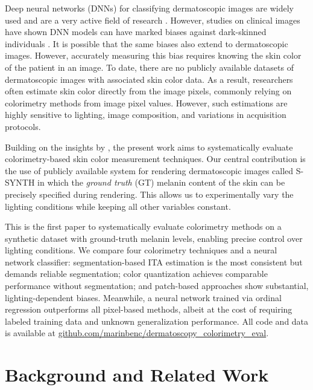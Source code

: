 \documentclass[a4paper,conference]{IEEEtran}
\begin{document}
Deep neural networks (DNNs) for classifying dermatoscopic images  are widely used and are a very active field of research \cite{kurtanskyEffectPatientContextual2024, estevaDermatologistlevelClassificationSkin2017}. However, studies on clinical images have shown DNN models can have marked biases against dark-skinned individuals \cite{daneshjouDisparitiesDermatologyAI2022, bevanDetectingMelanomaFairly2022}. It is possible that the same biases also extend to dermatoscopic images. However, accurately measuring this bias requires knowing the skin color of the patient in an image. To date, there are no publicly available datasets of dermatoscopic images with associated skin color data. As a result, researchers often estimate skin color directly from the image pixels, commonly relying on colorimetry methods from image pixel values. However, such estimations are highly sensitive to lighting, image composition, and variations in acquisition protocols.

Building on the insights by \citet{kalbRevisitingSkinTone2023}, the present work aims to systematically evaluate colorimetry-based skin color measurement techniques. Our central contribution is the use of publicly available system for rendering dermatoscopic images called S-SYNTH \cite{kim2024ssynth} in which the \textit{ground truth} (GT) melanin content of the skin can be precisely specified during rendering. This allows us to experimentally vary the lighting conditions while keeping all other variables constant.

This is the first paper to systematically evaluate colorimetry methods on a synthetic dataset with ground-truth melanin levels, 
enabling precise control over lighting conditions. We compare four colorimetry techniques and a neural network classifier: 
segmentation-based ITA estimation is the most consistent but demands reliable segmentation; color quantization achieves comparable 
performance without segmentation; and patch-based approaches show substantial, lighting-dependent biases. Meanwhile, a neural 
network trained via ordinal regression outperforms all pixel-based methods, albeit at the cost of requiring labeled training data and unknown generalization performance. All code and data is available at \href{https://github.com/marinbenc/dermatoscopy_colorimetry_eval}{github.com/marinbenc/dermatoscopy\_colorimetry\_eval}.

\section{Background and Related Work}
\end{document}
